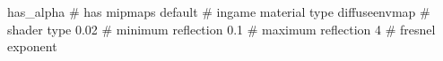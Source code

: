 has_alpha
# has mipmaps
default			 # ingame material type
diffuseenvmap            # shader type
0.02			 # minimum reflection
0.1			 # maximum reflection
4			 # fresnel exponent



